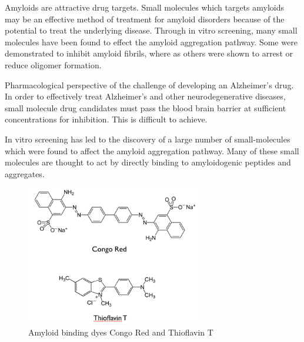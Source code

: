

Amyloids are attractive drug targets. Small molecules which targets amyloids may be an effective method of treatment for amyloid disorders because of the potential to treat the underlying disease. Through in vitro screening, many small molecules have been found to effect the amyloid aggregation pathway.  Some were demonstrated to inhibit amyloid fibrils, where as others were shown to arrest or reduce oligomer formation.
  
Pharmacological perspective of the challenge of developing an Alzheimer's drug. In order to effectively treat Alzheimer's and other neurodegenerative diseases, small molecule drug candidates must pass the blood brain barrier at sufficient concentrations for inhibition.  This is difficult to achieve.
      
In vitro screening has led to the discovery of a large number of small-molecules which were found to affect the amyloid aggregation pathway. Many of these small molecules are thought to act by directly binding to amyloidogenic peptides and aggregates.

\begin{figure}
\centering
\includegraphics[width=3in]{figures/introduction/dyes.png}
\caption[Small molecule binders]{Amyloid binding dyes Congo Red and Thioflavin T}
\label{fig:amyloid_dyes}
\end{figure}

